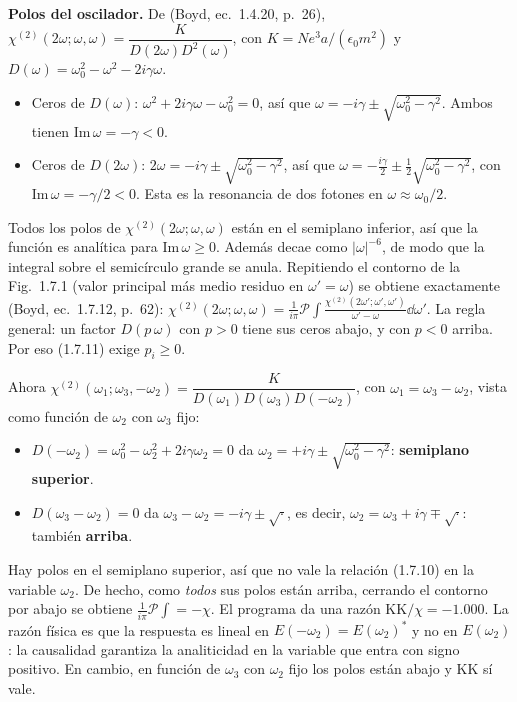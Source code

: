  \textbf{Polos del oscilador.} De (Boyd, ec.~1.4.20, p.~26),
$\chi^{(2)}(2\omega;\omega,\omega)=\dfrac{K}{D(2\omega)D^2(\omega)}$, con $K=Ne^3a/(\epsilon_0m^2)$ y $D(\omega)=\omega_0^2-\omega^2-2i\gamma\omega$.
\begin{itemize}
\item Ceros de $D(\omega)$: $\omega^2+2i\gamma\omega-\omega_0^2=0$, así que $\omega=-i\gamma\pm\sqrt{\omega_0^2-\gamma^2}$. Ambos tienen $\mathrm{Im}\,\omega=-\gamma<0$.
\item Ceros de $D(2\omega)$: $2\omega=-i\gamma\pm\sqrt{\omega_0^2-\gamma^2}$, así que $\omega=-\tfrac{i\gamma}{2}\pm\tfrac12\sqrt{\omega_0^2-\gamma^2}$, con $\mathrm{Im}\,\omega=-\gamma/2<0$.
Esta es la resonancia de dos fotones en $\omega\approx\omega_0/2$.
\end{itemize}
Todos los polos de $\chi^{(2)}(2\omega;\omega,\omega)$ están en el semiplano inferior, así que la función es analítica para $\mathrm{Im}\,\omega\ge0$. Además decae como
$|\omega|^{-6}$, de modo que la integral sobre el semicírculo grande se anula. Repitiendo el contorno de la Fig.~1.7.1 (valor principal más medio residuo en
$\omega'=\omega$) se obtiene exactamente (Boyd, ec.~1.7.12, p.~62):
$\chi^{(2)}(2\omega;\omega,\omega)=\frac{1}{i\pi}\mathcal P\!\int\frac{\chi^{(2)}(2\omega';\omega',\omega')}{\omega'-\omega}\dd\omega'$.
La regla general: un factor $D(p\,\omega)$ con $p>0$ tiene sus ceros abajo, y con $p<0$ arriba. Por eso (1.7.11) exige $p_i\ge0$.

Ahora $\chi^{(2)}(\omega_1;\omega_3,-\omega_2)=\dfrac{K}{D(\omega_1)D(\omega_3)D(-\omega_2)}$, con $\omega_1=\omega_3-\omega_2$, vista como función de $\omega_2$ con $\omega_3$ fijo:
\begin{itemize}
\item $D(-\omega_2)=\omega_0^2-\omega_2^2+2i\gamma\omega_2=0$ da $\omega_2=+i\gamma\pm\sqrt{\omega_0^2-\gamma^2}$: \textbf{semiplano superior}.
\item $D(\omega_3-\omega_2)=0$ da $\omega_3-\omega_2=-i\gamma\pm\sqrt{\cdot}$, es decir, $\omega_2=\omega_3+i\gamma\mp\sqrt{\cdot}$: también \textbf{arriba}.
\end{itemize}
Hay polos en el semiplano superior, así que no vale la relación (1.7.10) en la variable $\omega_2$. De hecho, como \emph{todos} sus polos están arriba, cerrando el
contorno por abajo se obtiene $\frac{1}{i\pi}\mathcal P\!\int=-\chi$. El programa da una razón KK$/\chi=-1.000$. La razón física es que la respuesta es lineal en
$E(-\omega_2)=E(\omega_2)^*$ y no en $E(\omega_2)$: la causalidad garantiza la analiticidad en la variable que entra con signo positivo. En cambio, en función de
$\omega_3$ con $\omega_2$ fijo los polos están abajo y KK sí vale.

